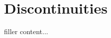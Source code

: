 \documentclass[../../templates/section]{subfiles}
\begin{document}
\section{Discontinuities}\label{sec:discontinuities}

filler content...
\end{document}
